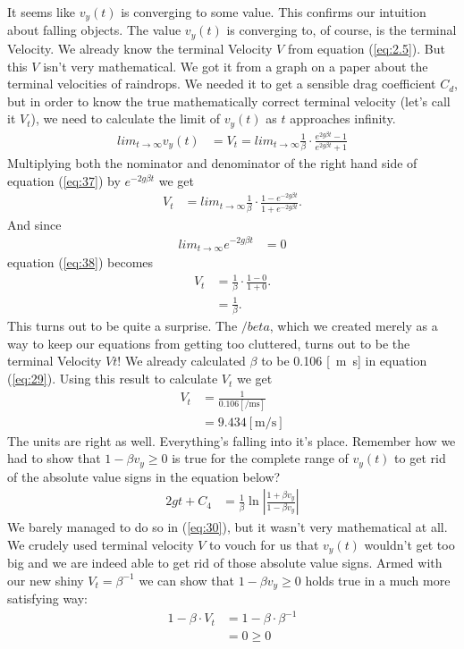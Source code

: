 \documentclass[paper=a4, fontsize=11pt]{scrartcl} %
\numberwithin{equation}{section} %
\numberwithin{figure}{section} %
\numberwithin{table}{section} %
\begin{document}
It seems like $v_y(t)$ is converging to some value. This confirms our intuition about falling objects.
The value $v_y(t)$ is converging to, of course, is the terminal Velocity.
We already know the terminal Velocity $V$ from equation (\ref{eq:2.5}). But this $V$ isn't very mathematical. 
We got it from a graph on a paper about the terminal velocities of raindrops.
We needed it to get a sensible drag coefficient $C_d$, but in order to know the true 
mathematically correct terminal velocity (let's call it $V_t$), we need to calculate the limit 
of $v_y(t)$ as $t$ approaches infinity.
\begin{align} 
lim_{t\to\infty} v_y(t) &= V_t = lim_{t\to\infty} \frac{1}{\beta} \cdot \frac{e^{2 g \beta t} - 1}{e^{2 g \beta t} + 1} \label{eq:37}
\end{align}
Multiplying both the nominator and denominator of the right hand side of equation (\ref{eq:37}) by $e^{-2 g \beta t}$ we get
\begin{align} 
V_t &= lim_{t\to\infty} \frac{1}{\beta} \cdot \frac{1 - e^{-2 g \beta t}}{1 + e^{-2 g \beta t}}. \label{eq:38}
\end{align}
And since 
\begin{align} 
lim_{t\to\infty} e^{-2 g \beta t} &= 0
\end{align}
equation (\ref{eq:38}) becomes
\begin{align} 
V_t &=  \frac{1}{\beta} \cdot \frac{1 - 0}{1 + 0}. \label{eq:39} \\
    &=  \frac{1}{\beta} . \label{eq:40}
\end{align}
This turns out to be quite a surprise. The $/beta$, which we created merely as a way to keep our equations from getting too cluttered,
turns out to be the terminal Velocity $Vt$! We already calculated $\beta$ to be 0.106 [\si{\per\meter\second}] in equation (\ref{eq:29}).
Using this result to calculate $V_t$ we get
\begin{align} 
V_t &=  \frac{1}{0.106 [\si{\per\meter\second}]} \\
    &=  9.434 [\si{\meter\per\second}]
\end{align}
The units are right as well. Everything's falling into it's place. Remember how we had to show that $1 - \beta v_y \geq 0$ is true
for the complete range of $v_y(t)$ to get rid of the absolute value signs in the equation below?
\begin{align} 
2g t + C_4 &=  \frac{1}{\beta} \ln{\left|\frac{1 + \beta v_y}{1 - \beta v_y} \right|}
\end{align}
We barely managed to do so in (\ref{eq:30}), but it wasn't very mathematical at all. We crudely used terminal velocity $V$ to vouch for us
that $v_y(t)$ wouldn't get too big and we are indeed able to get rid of those absolute value signs.
Armed with our new shiny $V_t = \beta^{-1}$ we can show that $1 - \beta v_y \geq 0$ holds true in a much more satisfying way:
\begin{align} 
  1 - \beta \cdot V_t &= 1 - \beta \cdot \beta^{-1} \\
  &= 0 \geq 0
\end{align}
\end{document}
